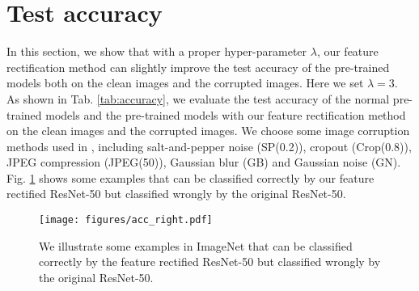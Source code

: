 \documentclass{article}
\begin{document}
\section{Test accuracy}\label{App:testacc}

In this section, we show that with a proper hyper-parameter $\lambda$, our feature rectification method can slightly improve the test accuracy of the pre-trained models both on the clean images and the corrupted images. Here we set $\lambda=3$. As shown in Tab. \ref{tab:accuracy}, we evaluate the test accuracy of the normal pre-trained models and the pre-trained models with our feature rectification method on the clean images and the corrupted images. We choose some image corruption methods used in \cite{hendrycks2018benchmarking}, including salt-and-pepper noise (SP(0.2)), cropout (Crop(0.8)), JPEG compression (JPEG(50)), Gaussian blur (GB) and Gaussian noise (GN). Fig. \ref{img:acc_right} shows some examples that can be classified correctly by our feature rectified ResNet-50 but classified wrongly by the original ResNet-50.

\begin{table}[htbp]
\caption{Test accuracy on ImageNet with the pre-trained ResNet-50 and DenseNet-121. Our method rectifies the feature vector of the model and performs well on both the clean images and the corrupted images. The best results are in bold.}
\end{table}

\begin{figure}[htbp]
\centering
\texttt{[image: figures/acc\_right.pdf]}
\caption{We illustrate some examples in ImageNet that can be classified correctly by the feature rectified ResNet-50 but classified wrongly by the original ResNet-50.}
\label{img:acc_right}
\end{figure}
\end{document}
